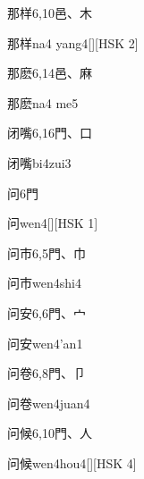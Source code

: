 \begin{entry}{那样}{6,10}{⾢、⽊}
  \begin{phonetics}{那样}{na4 yang4}[][HSK 2]
  \end{phonetics}
\end{entry}

\begin{entry}{那麽}{6,14}{⾢、⿇}
  \begin{phonetics}{那麽}{na4 me5}
  \end{phonetics}
\end{entry}

\begin{entry}{闭嘴}{6,16}{⾨、⼝}
  \begin{phonetics}{闭嘴}{bi4zui3}
  \end{phonetics}
\end{entry}

\begin{entry}{问}{6}{⾨}
  \begin{phonetics}{问}{wen4}[][HSK 1]
  \end{phonetics}
\end{entry}

\begin{entry}{问市}{6,5}{⾨、⼱}
  \begin{phonetics}{问市}{wen4shi4}
  \end{phonetics}
\end{entry}

\begin{entry}{问安}{6,6}{⾨、⼧}
  \begin{phonetics}{问安}{wen4'an1}
  \end{phonetics}
\end{entry}

\begin{entry}{问卷}{6,8}{⾨、⼙}
  \begin{phonetics}{问卷}{wen4juan4}
  \end{phonetics}
\end{entry}

\begin{entry}{问候}{6,10}{⾨、⼈}
  \begin{phonetics}{问候}{wen4hou4}[][HSK 4]
  \end{phonetics}
\end{entry}

